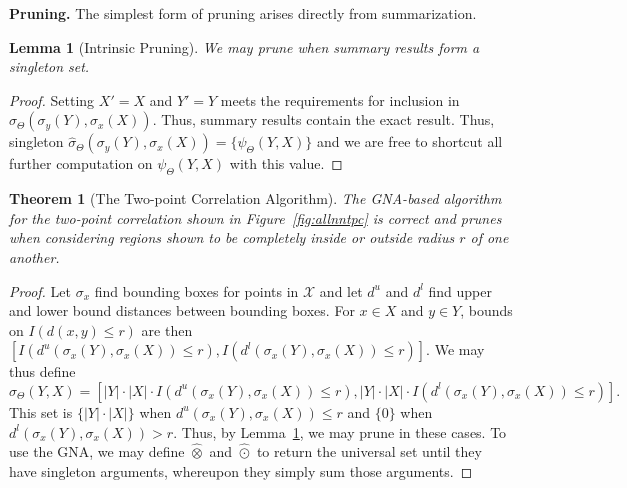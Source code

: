 \documentclass{article}
\newtheorem{theorem}{Theorem}
\newtheorem{lemma}{Lemma}
\newcommand{\maybekillspace}{\vspace{-0.08in}}
\newcommand{\killspace}{\vspace{-0.08in}}
\newcommand{\GNP}[1][\psi]{{#1}_{\Theta}}
\newcommand{\sigmahat}{\mathbin{\widehat{\sigma}}}
\newcommand{\otimeshat}{\mathbin{\widehat{\otimes}}}
\newcommand{\odothat}{\mathbin{\widehat{\odot}}}
\newcommand{\disthrectmin}{d^{l}}
\newcommand{\disthrectmax}{d^{u}}
\begin{document}
{\bf Pruning.}  The simplest form of pruning arises directly from
summarization.
\begin{lemma}[Intrinsic Pruning]\label{lem:intrinsic}
  We may prune when summary results form a singleton set.
\end{lemma}
\killspace
\killspace
\begin{proof}
  Setting $X' = X$ and $Y' = Y$ meets the requirements for inclusion in $\GNP[\sigmahat](\sigma_y(Y),\sigma_x(X))$.
  Thus, summary results contain the exact result.
  Thus, singleton $\GNP[\sigmahat](\sigma_y(Y),\sigma_x(X)) = \{\GNP(Y,X)\}$ and we are free to shortcut all further computation on $\GNP(Y,X)$ with this value.
\end{proof}
\killspace
\begin{theorem}[The Two-point Correlation Algorithm]
  The GNA-based algorithm for the two-point correlation shown in
  Figure~\ref{fig:allnntpc} is correct and prunes when considering
  regions shown to be completely inside or outside radius $r$ of one
  another.
\end{theorem}
\killspace
\killspace
\begin{proof}
  Let $\sigma_x$ find bounding boxes for points in $\mathcal{X}$ and
  let $\disthrectmax$ and $\disthrectmin$ find upper and lower bound distances between bounding boxes.
  For $x \in X$ and $y \in Y$, bounds on $I(d(x,y) \leq r)$ are then $\left[
  I(\disthrectmax(\sigma_x(Y),\sigma_x(X)) \leq r),
  I(\disthrectmin(\sigma_x(Y),\sigma_x(X)) \leq r) \right]$.
  We may thus define
  \[
  \GNP[\sigmahat](Y,X) = \left[ |Y| \cdot |X| \cdot I(\disthrectmax(\sigma_x(Y),\sigma_x(X)) \leq r), |Y| \cdot |X| \cdot I(\disthrectmin(\sigma_x(Y),\sigma_x(X)) \leq r) \right].
  \]
  This set is $\{|Y| \cdot |X|\}$ when
  $\disthrectmax(\sigma_x(Y),\sigma_x(X)) \leq r$ and $\{0\}$ when
  $\disthrectmin(\sigma_x(Y),\sigma_x(X)) > r$.  Thus, by
  Lemma~\ref{lem:intrinsic}, we may prune in these cases.  To
  use the GNA, we may define $\otimeshat$ and $\odothat$ to
  return the universal set until they have singleton arguments,
  whereupon they simply sum those arguments.
\end{proof}
\maybekillspace

\end{document}
